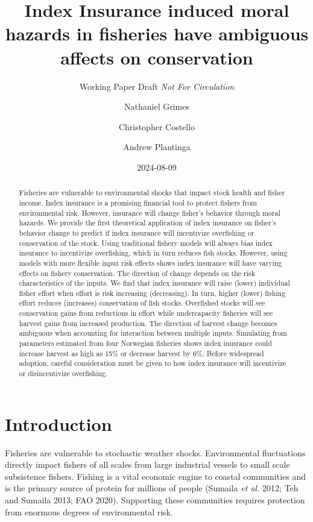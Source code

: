 \documentclass[
  letterpaper,
  DIV=11,
  numbers=noendperiod]{scrartcl}
\title{Index Insurance induced moral hazards in fisheries have ambiguous
affects on conservation}
\subtitle{Working Paper Draft \emph{Not For Circulation}}
\author{Nathaniel Grimes \and Christopher Costello \and Andrew
Plantinga}
\date{2024-08-09}
\renewcommand*\contentsname{Table of contents}
\newcommand\contentsname{Table of contents}
\theoremstyle{plain}
\theoremstyle{plain}
\theoremstyle{remark}
\begin{document}
\maketitle
\begin{abstract}
Fisheries are vulnerable to environmental shocks that impact stock
health and fisher income. Index insurance is a promising financial tool
to protect fishers from environmental risk. However, insurance will
change fisher's behavior through moral hazards. We provide the first
theoretical application of index insurance on fisher's behavior change
to predict if index insurance will incentivize overfishing or
conservation of the stock. Using traditional fishery models will always
bias index insurance to incentivize overfishing, which in turn reduces
fish stocks. However, using models with more flexible input risk effects
shows index insurance will have varying effects on fishery conservation.
The direction of change depends on the risk characteristics of the
inputs. We find that index insurance will raise (lower) individual
fisher effort when effort is risk increasing (decreasing). In turn,
higher (lower) fishing effort reduces (increases) conservation of fish
stocks. Overfished stocks will see conservation gains from reductions in
effort while undercapacity fisheries will see harvest gains from
increased production. The direction of harvest change becomes ambiguous
when accounting for interaction between multiple inputs. Simulating from
parameters estimated from four Norwegian fisheries shows index inusrance
could increase harvest as high as 15\% or decrease harvest by 6\%.
Before widespread adoption, careful consideration must be given to how
index insurance will incentivize or disincentivize overfishing.
\end{abstract}
\ifdefined\Shaded\renewenvironment{Shaded}{\begin{tcolorbox}[breakable, sharp corners, enhanced, interior hidden, frame hidden, borderline west={3pt}{0pt}{shadecolor}, boxrule=0pt]}{\end{tcolorbox}}\fi

\renewcommand*\contentsname{Table of contents}
{
\hypersetup{linkcolor=}
\setcounter{tocdepth}{3}
\tableofcontents
}
\hypertarget{introduction}{%
\section{Introduction}\label{introduction}}

Fisheries are vulnerable to stochastic weather shocks. Environmental
fluctuations directly impact fishers of all scales from large industrial
vessels to small scale subsistence fishers. Fishing is a vital economic
engine to coastal communities and is the primary source of protein for
millions of people (Sumaila \emph{et al.} 2012; Teh and Sumaila 2013;
FAO 2020). Supporting these communities requires protection from
enormous degrees of environmental risk.
\end{document}
